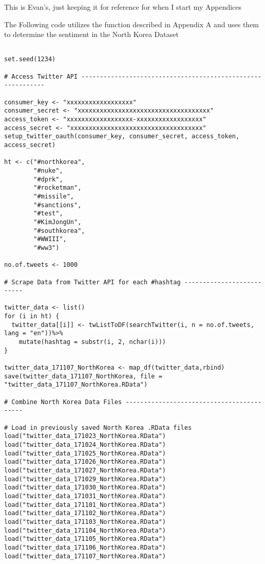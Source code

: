 This is Evan's, just keeping it for reference for when I start my Appendices 

The Following code utilizes the function described in Appendix A and uses them to determine the sentiment in the North Korea Dataset



\begin{lstlisting}

set.seed(1234)

# Access Twitter API ------------------------------------------------------------

consumer_key <- "xxxxxxxxxxxxxxxxxx"
consumer_secret <- "xxxxxxxxxxxxxxxxxxxxxxxxxxxxxxxxxxxx"
access_token <- "xxxxxxxxxxxxxxxxxx-xxxxxxxxxxxxxxxxxx"
access_secret <- "xxxxxxxxxxxxxxxxxxxxxxxxxxxxxxxxxxxx"
setup_twitter_oauth(consumer_key, consumer_secret, access_token, access_secret)

ht <- c("#northkorea",
        "#nuke",
        "#dprk",
        "#rocketman",
        "#missile",
        "#sanctions",
        "#test",
        "#KimJongUn",
        "#southkorea",
        "#WWIII",
        "#ww3")

no.of.tweets <- 1000

# Scrape Data from Twitter API for each #hashtag --------------------------

twitter_data <- list()
for (i in ht) {
  twitter_data[[i]] <- twListToDF(searchTwitter(i, n = no.of.tweets, lang = "en"))%>% 
    mutate(hashtag = substr(i, 2, nchar(i)))
}

twitter_data_171107_NorthKorea <- map_df(twitter_data,rbind)
save(twitter_data_171107_NorthKorea, file = "twitter_data_171107_NorthKorea.RData")

# Combine North Korea Data Files ------------------------------------------

# Load in previously saved North Korea .RData files
load("twitter_data_171023_NorthKorea.RData")
load("twitter_data_171024_NorthKorea.RData")
load("twitter_data_171025_NorthKorea.RData")
load("twitter_data_171026_NorthKorea.RData")
load("twitter_data_171027_NorthKorea.RData")
load("twitter_data_171029_NorthKorea.RData")
load("twitter_data_171030_NorthKorea.RData")
load("twitter_data_171031_NorthKorea.RData")
load("twitter_data_171101_NorthKorea.RData")
load("twitter_data_171102_NorthKorea.RData")
load("twitter_data_171103_NorthKorea.RData")
load("twitter_data_171104_NorthKorea.RData")
load("twitter_data_171105_NorthKorea.RData")
load("twitter_data_171106_NorthKorea.RData")
load("twitter_data_171107_NorthKorea.RData")


\end{lstlisting}
